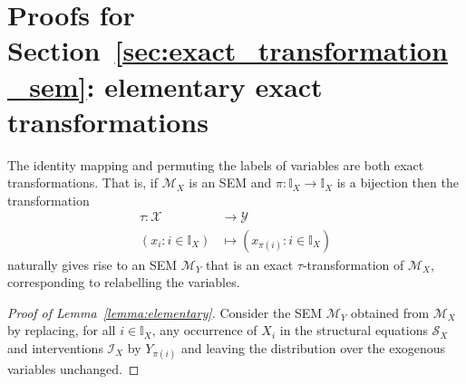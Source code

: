 %
%




%




\section{Proofs for Section~\ref{sec:exact_transformation_sem}: elementary exact transformations}\label{first_properties:appendix}

{
\renewcommand{\thedefinition}{\ref{lemma:elementary}}
\begin{lemma}
The identity mapping and permuting the labels of variables are both exact transformations.
That is, if $\mathcal{M}_X$ is an SEM and $\pi:\mathbb{I}_X \to \mathbb{I}_X$ is a bijection then the transformation
\begin{align*}
\tau:\mathcal{X}&\to\mathcal{Y}\\
(x_i:i\in\mathbb{I}_X) &\mapsto (x_{\pi(i)}:i\in\mathbb{I}_X)
\end{align*}
naturally gives rise to an SEM $\mathcal{M}_Y$ that is an exact $\tau$-transformation of $\mathcal{M}_X$, corresponding to relabelling the variables.
\end{lemma}
\addtocounter{definition}{-1}
}
%
\begin{proof}[Proof of Lemma~\ref{lemma:elementary}]
Consider the SEM $\mathcal{M}_Y$ obtained from $\mathcal{M}_X$ by replacing, for all $i\in\mathbb{I}_X$, any occurrence of $X_i$ in the structural equations $\mathcal{S}_X$ and interventions $\mathcal{I}_X$ by $Y_{\pi(i)}$ and leaving the distribution over the exogenous variables unchanged.
\end{proof}



